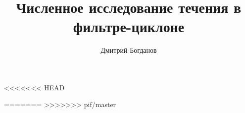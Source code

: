 \documentclass[12pt,a4paper]{article}
\title{Численное исследование течения в фильтре-циклоне}
\author{Дмитрий Богданов}
\date{}
\begin{document}

\tableofcontents
\newpage

\newpage
<<<<<<< HEAD

\newpage
=======
>>>>>>> pif/master

\newpage

\clearpage
\newpage

\newpage
\thispagestyle{plain}


\end{document}
